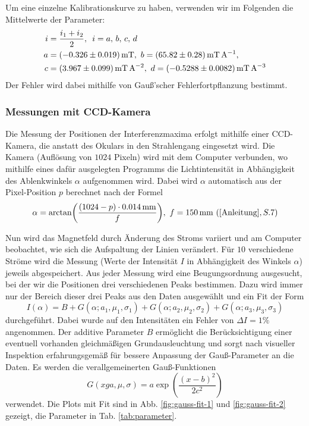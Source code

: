 \documentclass{article}
\begin{document}
\begin{multicols}{2}
Um eine einzelne Kalibrationskurve zu haben, verwenden wir im Folgenden die Mittelwerte der Parameter:
\begin{align*}
  i &= \frac{i_1+i_2}{2},\enspace i=a,\,b,\,c,\,d \\
  a&=\SI{-0.326 \pm 0.019}{\mT},\ b=\SI{65.82 \pm 0.28}{\mT\per\A}, \\
  c&=\SI{3.967 \pm 0.099}{\mT\per\A\squared},\ d=\SI{-0.5288 \pm 0.0082}{\mT\per\A\cubed}
\end{align*}
Der Fehler wird dabei mithilfe von Gauß'scher Fehlerfortpflanzung bestimmt.


\subsubsection{Messungen mit CCD-Kamera} \label{messungmessung}
Die Messung der Positionen der Interferenzmaxima erfolgt mithilfe einer CCD-Kamera, die anstatt des Okulars
in den Strahlengang eingesetzt wird. Die Kamera (Auflösung von $1024$ Pixeln) wird mit dem Computer verbunden, wo mithilfe eines dafür ausgelegten
Programms die Lichtintensität in Abhängigkeit des Ablenkwinkels $\alpha$ aufgenommen wird.
Dabei wird $\alpha$ automatisch aus der Pixel-Position $p$ berechnet nach der Formel
\[
  \alpha = \arctan(\frac{(1024-p) \cdot \SI{0.014}{\mm}}{f}),\ f=\SI{150}{\mm}\ (\cite{Anleitung}, S.7)
\]

Nun wird das Magnetfeld durch Änderung des Stroms variiert und am Computer beobachtet,
wie sich die Aufspaltung der Linien verändert.
Für $10$ verschiedene Ströme wird die Messung (Werte der Intensität $I$ in Abhängigkeit des Winkels $\alpha$) jeweils abgespeichert.
Aus jeder Messung wird eine Beugungsordnung ausgesucht, bei der wir die Positionen drei verschiedenen Peaks bestimmen.
Dazu wird immer nur der Bereich dieser drei Peaks aus den Daten ausgewählt und ein Fit der Form
\[
  I(\alpha) = B + G(\alpha; a_1, \mu_1, \sigma_1) + G(\alpha; a_2, \mu_2, \sigma_2) + G(\alpha; a_3, \mu_3, \sigma_3)
\]
durchgeführt. Dabei wurde auf den Intensitäten ein Fehler von $\Delta I = 1\%$ angenommen.
Der additive Parameter $B$ ermöglicht die Berücksichtigung einer eventuell vorhanden gleichmäßigen Grundausleuchtung
und sorgt nach visueller Inspektion erfahrungsgemäß für bessere Anpassung der Gauß-Parameter an die Daten.
Es werden die verallgemeinerten Gauß-Funktionen
\[
  G(xg a, \mu, \sigma) = a \exp(\frac{(x-b)^2}{2c^2})
\]
verwendet. 
Die Plots mit Fit sind in Abb. \ref{fig:gauss-fit-1} und \ref{fig:gauss-fit-2} gezeigt, die Parameter in Tab. \ref{tab:parameter}.


\end{multicols}
\end{document}
